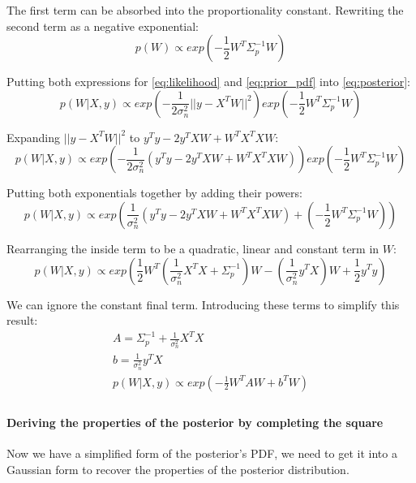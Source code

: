 The first term can be absorbed into the proportionality constant. Rewriting the second term as a negative exponential:
\begin{equation} \label{eq:prior_pdf}
    p(W) \propto exp\left(-\frac{1}{2}W^T\Sigma_p^{-1}W\right)
\end{equation}

Putting both expressions for \ref{eq:likelihood} and \ref{eq:prior_pdf} into \ref{eq:posterior}:
\begin{equation*}
    p(W|X,y) \propto exp\left(-\frac{1}{2\sigma^2_n}||y -X^TW||^2\right)exp\left(-\frac{1}{2}W^T\Sigma_p^{-1}W\right)
\end{equation*}

Expanding $||y - X^TW||^2$ to $y^Ty - 2y^TXW + W^TX^TXW$:
\begin{equation*}
    p(W|X,y) \propto exp\left(-\frac{1}{2\sigma^2_n}(y^Ty - 2y^TXW + W^TX^TXW)\right)exp\left(-\frac{1}{2}W^T\Sigma_p^{-1}W\right)
\end{equation*}

Putting both exponentials together by adding their powers:
\begin{equation*}
    p(W|X,y) \propto exp\left(\frac{1}{\sigma^2_n}(y^Ty - 2y^TXW + W^TX^TXW) + \left(-\frac{1}{2}W^T\Sigma_p^{-1}W\right)\right)
\end{equation*}

Rearranging the inside term to be a quadratic, linear and constant term in $W$:
\begin{equation*}
    p(W|X,y) \propto exp\left(\frac{1}{2}W^T\left(\frac{1}{\sigma^2_n}X^TX + \Sigma_p^{-1}\right)W - \left(\frac{1}{\sigma^2_n}y^TX\right)W + \frac{1}{2}y^Ty\right)
\end{equation*}

We can ignore the constant final term. Introducing these terms to simplify this result:
\begin{equation} \label{eq:A_b}
    \begin{aligned}
        A = \Sigma_p^{-1} + \frac{1}{\sigma^2_n}X^TX \\
        b = \frac{1}{\sigma^2_n}y^TX \\
        p(W|X,y) \propto exp\left(-\frac{1}{2}W^TAW + b^TW\right) \\
    \end{aligned}
\end{equation}

\paragraph{Deriving the properties of the posterior by completing the square}
Now we have a simplified form of the posterior's PDF, we need to get it into a Gaussian form to recover the properties of the posterior distribution.

